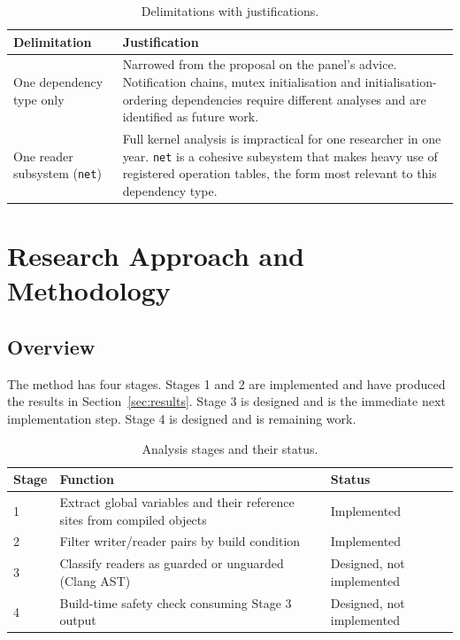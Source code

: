 \documentclass[12pt, a4paper, oneside]{book}
\begin{document}
\begin{table}[H]
\centering
\caption{Delimitations with justifications.}
\renewcommand{\arraystretch}{1.5}
\begin{tabularx}{\textwidth}{L{4cm} L{8.5cm}}
\toprule
\textbf{Delimitation} & \textbf{Justification} \\
\midrule
One dependency type only &
  Narrowed from the proposal on the panel's advice. Notification chains, mutex
  initialisation and initialisation-ordering dependencies require different
  analyses and are identified as future work. \\
\addlinespace
One reader subsystem (\texttt{net}) &
  Full kernel analysis is impractical for one researcher in one year.
  \texttt{net} is a cohesive subsystem that makes heavy use of registered
  operation tables, the form most relevant to this dependency type. \\
\bottomrule
\end{tabularx}
\end{table}

\chapter{Research Approach and Methodology}
\label{sec:method}

\section{Overview}

The method has four stages. Stages 1 and 2 are implemented and have produced the
results in Section~\ref{sec:results}. Stage 3 is designed and is the immediate
next implementation step. Stage 4 is designed and is remaining work.

\begin{table}[H]
\centering
\caption{Analysis stages and their status.}
\renewcommand{\arraystretch}{1.4}
\begin{tabularx}{\textwidth}{C{1.4cm} L{6.6cm} L{4.6cm}}
\toprule
\textbf{Stage} & \textbf{Function} & \textbf{Status} \\
 & Extract global variables and their reference sites from compiled objects
  & Implemented \\
2 & Filter writer/reader pairs by build condition
  & Implemented \\
3 & Classify readers as guarded or unguarded (Clang AST)
  & Designed, not implemented \\
4 & Build-time safety check consuming Stage 3 output
  & Designed, not implemented \\
\bottomrule
\end{tabularx}
\end{table}
\end{document}
